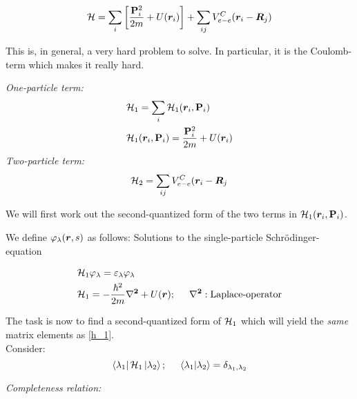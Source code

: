 \begin{equation}
	\mathcal{H} = \sum_i \left[\frac{\vb{P}_i^2}{2m} + U(\bm{r}_i)  \right]+ \sum_{ij} V_{e-e}^C (\bm{r}_i-\bm{R}_j)
\end{equation}

\noindent This is, in general, a very hard problem to solve. In particular, it is the Coulomb-term which makes it really hard.\\
\linebreak

\noindent\emph{One-particle term:}
\begin{align}
	&\mathcal{H}_1 = \sum_i \mathcal{H}_1 (\bm{r}_i, \vb{P}_i)\\
	&\mathcal{H}_1 (\bm{r}_i, \vb{P}_i) = \frac{\vb{P}_i^2}{2m} + U(\bm{r}_i)
\end{align}
\linebreak
\noindent \emph{Two-particle term:}
\begin{equation}
	\mathcal{H}_2 = \sum_{ij} V_{e-e}^C (\bm{r}_i-\bm{R}_j
\end{equation}

\noindent We will first work out the second-quantized form of the two terms in $\mathcal{H}_1 (\bm{r}_i, \vb{P}_i)$. \\
\linebreak

\noindent We define $\varphi_\lambda ( \bm{r},s)$ as follows:
Solutions to the single-particle Schrödinger-equation

\begin{align}
	&\Ha_1 \varphi_\lambda = \varepsilon_\lambda \varphi_\lambda\\
	&\Ha_1 = -\frac{\hbar^2}{2m} \vb{\laplacian} + U(\vr) ; \hspace{0.5cm} \vb{\laplacian} : \text{Laplace-operator} \label{h_1}
\end{align}

\noindent The task is now to find a second-quantized form of $\mathcal{H}_1$ which will yield the \emph{same} matrix elements as \ref{h_1}.\\
\linebreak
\noindent Consider:
\begin{equation}
	\bra{\lambda_1} \mathcal{H}_1 \ket{\lambda_2} ; \hspace{0.5cm} \braket{\lambda_1}{\lambda_2} = \delta_{\lambda_1, \lambda_2}
\end{equation}

\noindent \emph{Completeness relation:}

